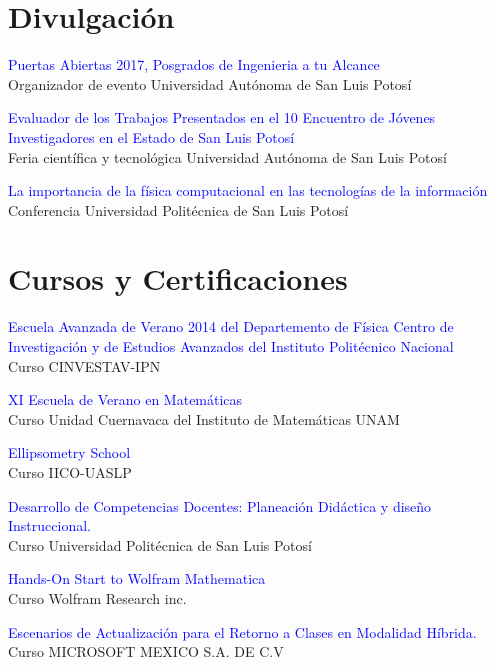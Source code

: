 \documentclass[letterpaper]{twentysecondcv} %
\begin{document}
\section{Divulgaci\'on}

\begin{twenty} %
{\textcolor{blue}{Puertas Abiertas 2017, Posgrados de Ingenieria a tu Alcance}}
{\\Organizador de evento}
{ Universidad Aut\'onoma de San Luis Potos\'i}

{\textcolor{blue}{Evaluador de los Trabajos Presentados en el 10 Encuentro de J\'ovenes Investigadores en el Estado de San Luis Potos\'i}}
{\\Feria científica y tecnológica}
{ Universidad Aut\'onoma de San Luis Potos\'i}

{\textcolor{blue}{La importancia de la f\'isica computacional en las tecnolog\'ias de la informaci\'on}}
{\\Conferencia}
{ Universidad Polit\'ecnica de San Luis Potos\'i}


\end{twenty}
\newpage 
\makeprofile 

\section{Cursos y Certificaciones}

\begin{twenty} %
{\textcolor{blue}{Escuela Avanzada de Verano
2014 del Departemento de F\'isica
Centro de Investigación y de
Estudios Avanzados del Instituto Polit\'ecnico Nacional}}
{\\Curso}
{CINVESTAV-IPN}

{\textcolor{blue}{XI Escuela de Verano en Matem\'aticas}}
{\\Curso}
{Unidad Cuernavaca del Instituto de Matemáticas UNAM}


{\textcolor{blue}{Ellipsometry School}}
{\\Curso}
{IICO-UASLP}

{\textcolor{blue}{Desarrollo de Competencias Docentes: Planeaci\'on Did\'actica y dise\~no Instruccional. }}
{\\Curso}
{Universidad Polit\'ecnica de San Luis Potos\'i}

{\textcolor{blue}{Hands-On Start to Wolfram Mathematica }}
{\\Curso}
{Wolfram Research inc.}

{\textcolor{blue}{Escenarios de Actualizaci\'on para el Retorno a Clases en Modalidad H\'ibrida.}}
{\\Curso}
{MICROSOFT MEXICO S.A. DE C.V}
\end{twenty}
\end{document}

